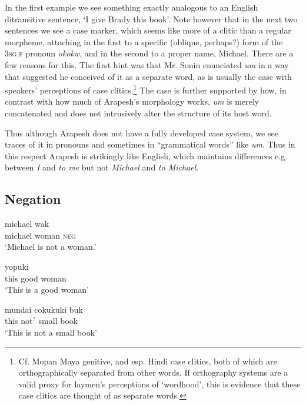 \documentclass[pdftex,12pt,letterpaper]{article}
\let\ipa\textipa
\def\sw{\ipa{\super w}}
\begin{document}
 \noindent In the first example we see something exactly analogous to an English ditransitive sentence, `I give Brady this book'. Note however that in the next two sentences we see a case marker, which seems like more of a clitic than a regular morpheme, attaching in the first to a specific (oblique, perhaps?) form of the \textsc{3sg.f} pronoun \emph{okokw}, and in the second to a proper name, Michael. There are a few reasons for this. The first hint was that Mr. Sonin enunciated \emph{um} in a way that suggested he conceived of it as a separate word, as is usually the case with speakers' perceptions of case clitics.\footnote{Cf. Mopan Maya genitive, and esp. Hindi case clitics, both of which are orthographically separated from other words. If orthography systems are a valid proxy for laymen's perceptions of `wordhood', this is evidence that these case clitics are thought of as separate words.} The case is further supported by how, in contrast with how much of Arapesh's morphology works, \emph{um} is merely concatenated and does not intrusively alter the structure of its host word.

 Thus although Arapesh does not have a fully developed case system, we see traces of it in pronouns and sometimes in ``grammatical words'' like \emph{um}. Thus in this respect Arapesh is strikingly like English, which maintains differences e.g. between \emph{I} and \emph{to me} but not \emph{Michael} and \emph{to Michael}.
 
 \subsection{Negation}
 
\begin{exe}
\ex
\gll michael \ipa{@rmatok\sw} wak \\
michael woman \textsc{neg} \\
\trans `Michael is not a woman.'

 \ex 
 \gll \ipa{@k\sw ud@} yopuk\sw i \ipa{@rmatok\sw} \\
 this good woman \\ 
 \trans `This is a good woman'
 
 \ex
 \gll \ipa{@kud@} mundai cokuk\sw uk\sw i buk \\
 this not$^?$ small book \\
 \trans `This is not a small book'


\end{exe}
\end{document}
